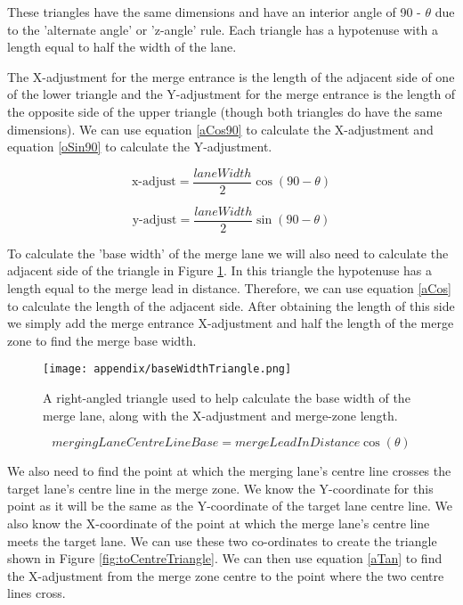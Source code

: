 \begin{appendices}
These triangles have the same dimensions and have an interior angle of 90 - $\theta$ due to the 'alternate angle' or 'z-angle' rule. Each triangle has a hypotenuse with a length equal to half the width of the lane. 

The X-adjustment for the merge entrance is the length of the adjacent side of one of the lower triangle and the Y-adjustment for the merge entrance is the length of the opposite side of the upper triangle (though both triangles do have the same dimensions). We can use equation \ref{aCos90} to calculate the X-adjustment and equation \ref{oSin90} to calculate the Y-adjustment.

\begin{equation}\label{aCos90}
\text{x-adjust} = \frac{laneWidth}{2} \cos(90 - \theta)
\end{equation}

\begin{equation}\label{oSin90}
\text{y-adjust} = \frac{laneWidth}{2} \sin(90 - \theta)
\end{equation}

To calculate the 'base width' of the merge lane we will also need to calculate the adjacent side of the triangle in Figure \ref{fig:baseWidthTriangle}. In this triangle the hypotenuse has a length equal to the merge lead in distance. Therefore, we can use equation \ref{aCos} to calculate the length of the adjacent side. After obtaining the length of this side we simply add the merge entrance X-adjustment and half the length of the merge zone to find the merge base width.

\begin{figure}[htb]
\texttt{[image: appendix/baseWidthTriangle.png]}
\caption{A right-angled triangle used to help calculate the base width of the merge lane, along with the X-adjustment and merge-zone length.}
\label{fig:baseWidthTriangle}
\end{figure}

\begin{equation}\label{aCos}
mergingLaneCentreLineBase = mergeLeadInDistance \cos(\theta)
\end{equation}

We also need to find the point at which the merging lane's centre line crosses the target lane's centre line in the merge zone. We know the Y-coordinate for this point as it will be the same as the Y-coordinate of the target lane centre line. We also know the X-coordinate of the point at which the merge lane's centre line meets the target lane. We can use these two co-ordinates to create the triangle shown in Figure \ref{fig:toCentreTriangle}. We can then use equation \ref{aTan} to find the X-adjustment from the merge zone centre to the point where the two centre lines cross.


\end{appendices}
